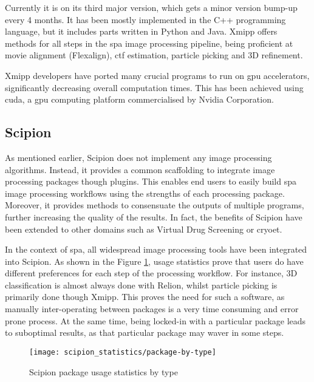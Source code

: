 \documentclass[../main.tex]{subfiles}
\begin{document}
Currently it is on its third major version, which gets a minor version bump-up every 4 months. It has been mostly implemented in the C++ programming language, but it includes parts written in Python and Java. Xmipp offers methods for all steps in the \gls{spa} image processing pipeline, being proficient at movie alignment (Flexalign)\cite{strelak2021}, \gls{ctf} estimation, particle picking and 3D refinement.

Xmipp developers have ported many crucial programs to run on \gls{gpu} accelerators, significantly decreasing overall computation times. This has been achieved using \gls{cuda}, a \gls{gpu} computing platform commercialised by Nvidia Corporation.

\subsection{Scipion}
As mentioned earlier, Scipion does not implement any image processing algorithms. Instead, it provides a common scaffolding to integrate image processing packages though plugins. This enables end users to easily build \gls{spa} image processing workflows using the strengths of each processing package. Moreover, it provides methods to consensuate the outputs of multiple programs, further increasing the quality of the results. In fact, the benefits of Scipion have been extended to other domains such as Virtual Drug Screening\cite{scipion_chem} or \gls{cryoet}\cite{jimenezdelamorena2021}.

In the context of \gls{spa}, all widespread image processing tools have been integrated into Scipion. As shown in the Figure \ref{fig:3:scipion_statistics_type}, usage statistics prove that users do have different preferences for each step of the processing workflow. For instance, 3D classification is almost always done with Relion, whilst particle picking is primarily done though Xmipp. This proves the need for such a software, as manually inter-operating between packages is a very time consuming and error prone process. At the same time, being locked-in with a particular package leads to suboptimal results, as that particular package may waver in some steps.

\begin{figure}[htbp]
    \centering
    \texttt{[image: scipion\_statistics/package-by-type]}
    \caption{Scipion package usage statistics by type}
    \label{fig:3:scipion_statistics_type}
\end{figure}
\end{document}
